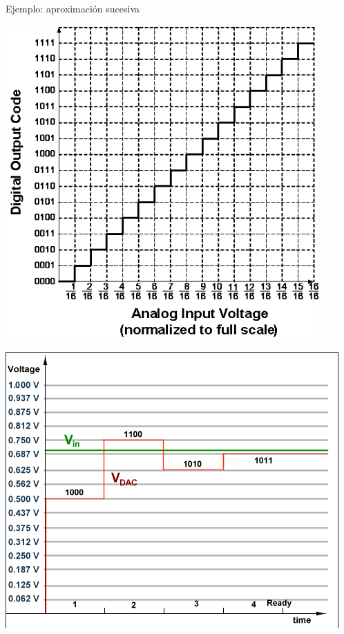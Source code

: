 \documentclass[aspectratio=169]{beamer}
\begin{document}
\begin{frame}{Ejemplo: aproximación sucesiva}
    \begin{minipage}[t]{0.45\textwidth}
        \centering
        \includegraphics[width=0.9\textwidth]{presentaciones/fig/curve4bit.png}
    \end{minipage}
    \hfill
    \begin{minipage}[t]{0.45\textwidth}
        \includegraphics[width=\textwidth]{presentaciones/fig/ADCtime.png}
    \end{minipage}
\end{frame}


% 
% 

\end{document}
